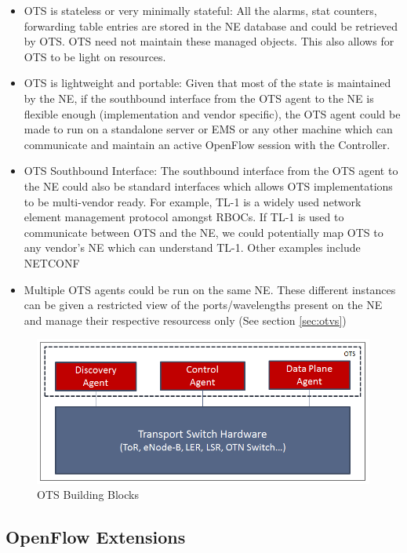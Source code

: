 \documentclass{sig-alternate-10pt}
\begin{document}
	\begin{itemize}
	    \item OTS is stateless or very minimally stateful: All the alarms, stat counters, forwarding table entries are 
		stored in the NE database and could be retrieved by OTS. OTS need not maintain these managed objects. 
		This also allows for OTS to be light on resources.
	    \item OTS is lightweight and portable: Given that most of the state is maintained by the NE, if the southbound 
		interface from the OTS agent to the NE is flexible enough (implementation and vendor specific), the OTS 
		agent could be made to run on a standalone server or EMS or any other machine which can communicate 
		and maintain an active OpenFlow session with the Controller.
	    \item OTS Southbound Interface: The southbound interface from the OTS agent to the NE could also be 
		standard interfaces which allows OTS implementations to be multi-vendor ready. For example, TL-1 \cite{tl1} 
		is a widely used network element management protocol amongst RBOCs. If TL-1 is used to communicate between 
		OTS and the NE, we could potentially map OTS to any vendor's NE which can understand TL-1. Other
		examples include NETCONF \cite{netconf}
  	    \item Multiple OTS agents could be run on the same NE. These different instances can be given a restricted 
		view of the ports/wavelengths present on the NE and manage their respective resourcess only 
		(See section \ref{sec:otvs})
	\end{itemize}

	\begin{figure}[htb]
	\centering
	\includegraphics[scale=0.37]{OTSArch.png}
	\caption{OTS Building Blocks}
	\label{fig:OTSArch}
	\end{figure}

	\subsection{OpenFlow Extensions}
	\label{sec:ofext}
	
\end{document}
